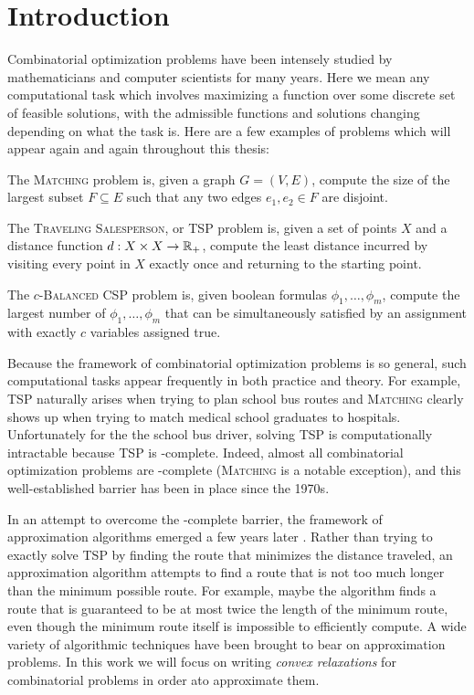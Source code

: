 \chapter{Introduction}\label{cha:introduction}
Combinatorial optimization problems have been intensely studied by mathematicians and computer scientists for many years.
Here we mean any computational task which involves maximizing a function over some discrete set of feasible solutions, with the admissible functions and solutions changing depending on what the task is. 
Here are a few examples of problems which will appear again and again throughout this thesis:
\begin{example}
The \textsc{Matching} problem is, given a graph $G = (V,E)$, compute the size of the largest subset $F \subseteq E$ such that any two edges $e_1,e_2 \in F$ are disjoint.
\end{example}
\begin{example}
The \textsc{Traveling Salesperson}, or \textsc{TSP} problem is, given a set of points $X$ and a distance function $d: X \times X \rightarrow \mathbb R_+$, compute the least distance incurred by visiting every point in $X$ exactly once and returning to the starting point. 
\end{example}
\begin{example}
The \textsc{$c$-Balanced CSP} problem is, given boolean formulas $\phi_1,\dots,\phi_m$, compute the largest number of $\phi_1,\dots,\phi_m$ that can be simultaneously satisfied by an assignment with exactly $c$ variables assigned true. 
\end{example}

Because the framework of combinatorial optimization problems is so general, such computational tasks appear frequently in both practice and theory.
For example, \textsc{TSP} naturally arises when trying to plan school bus routes and \textsc{Matching} clearly shows up when trying to match medical school graduates to hospitals. Unfortunately for the the school bus driver, solving \textsc{TSP} is computationally intractable because \textsc{TSP} is \np-complete\cite{Karp1972}. Indeed, almost all combinatorial optimization problems are \np-complete (\textsc{Matching} is a notable exception), and this well-established barrier has been in place since the 1970s. 

In an attempt to overcome the \np-complete barrier, the framework of approximation algorithms emerged a few years later \cite{SG76}. Rather than trying to exactly solve \textsc{TSP} by finding the route that minimizes the distance traveled, an approximation algorithm attempts to find a route that is not too much longer than the minimum possible route. For example, maybe the algorithm finds a route that is guaranteed to be at most twice the length of the minimum route, even though the minimum route itself is impossible to efficiently compute. A wide variety of algorithmic techniques have been brought to bear on approximation problems. In this work we will focus on writing \emph{convex relaxations} for combinatorial problems in order ato approximate them.

